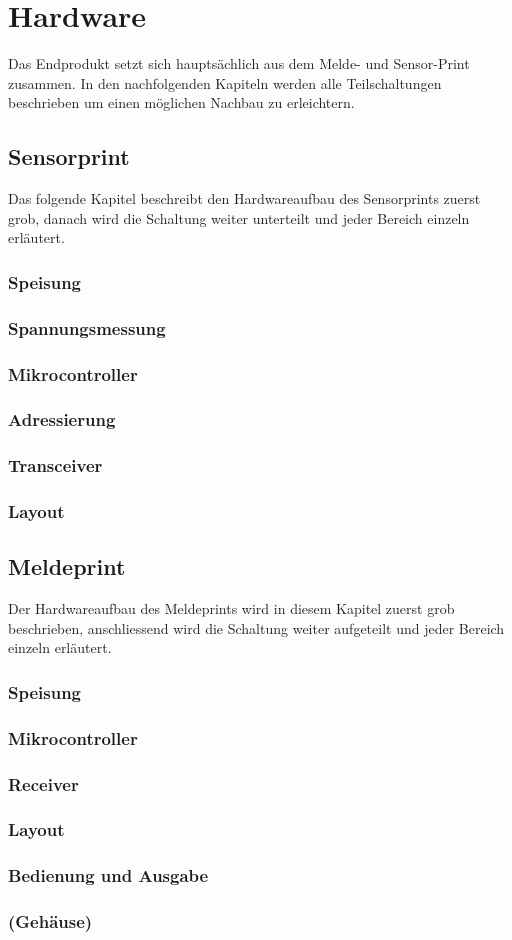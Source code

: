 \section{Hardware}
Das Endprodukt setzt sich hauptsächlich aus dem Melde- und Sensor-Print zusammen. In den nachfolgenden Kapiteln werden alle Teilschaltungen beschrieben um einen möglichen Nachbau zu erleichtern.
\subsection{Sensorprint}
Das folgende Kapitel beschreibt den Hardwareaufbau des Sensorprints zuerst grob, danach wird die Schaltung weiter unterteilt und jeder Bereich einzeln erläutert.
\subsubsection{Speisung}
\subsubsection{Spannungsmessung}
\subsubsection{Mikrocontroller}
\subsubsection{Adressierung}
\subsubsection{Transceiver}
\subsubsection{Layout}

\subsection{Meldeprint}
Der Hardwareaufbau des Meldeprints wird in diesem Kapitel zuerst grob beschrieben, anschliessend wird die Schaltung weiter aufgeteilt und jeder Bereich einzeln erläutert.
\subsubsection{Speisung}
\subsubsection{Mikrocontroller}
\subsubsection{Receiver}
\subsubsection{Layout}
\subsubsection{Bedienung und Ausgabe}
\subsubsection{(Gehäuse)}